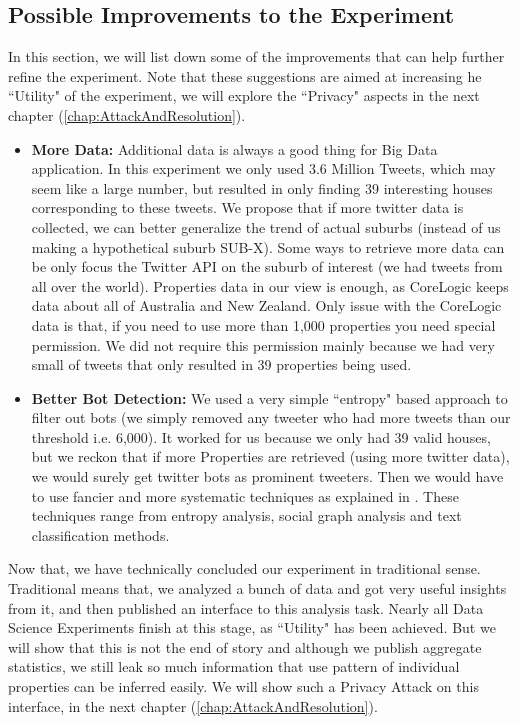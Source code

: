 \documentclass[12pt]{report}
\theoremstyle{named}
\begin{document}
\subsection{Possible Improvements to the Experiment}
In this section, we will list down some of the improvements that can help further refine the experiment. Note that these suggestions are aimed at increasing he ``Utility" of the experiment, we will explore the ``Privacy" aspects in the next chapter (\ref{chap:AttackAndResolution}).
\begin{itemize}
  \item \textbf{More Data:} Additional data is always a good thing for Big Data application. In this experiment we only used 3.6 Million Tweets, which may seem like a large number, but resulted in only finding 39 interesting houses corresponding to these tweets. We propose that if more twitter data is collected, we can better generalize the trend of actual suburbs (instead of us making a hypothetical suburb SUB-X). Some ways to retrieve more data can be only focus the Twitter API on the suburb of interest (we had tweets from all over the world). Properties data in our view is enough, as CoreLogic keeps data about all of Australia and New Zealand. Only issue with the CoreLogic data is that, if you need to use more than 1,000 properties you need special permission. We did not require this permission mainly because we had very small of tweets that only resulted in 39 properties being used.
  
  \item \textbf{Better Bot Detection:} We used a very simple ``entropy" based approach to filter out bots (we simply removed any tweeter who had more tweets than our threshold i.e. 6,000). It worked for us because we only had 39 valid houses, but we reckon that if more Properties are retrieved (using more twitter data), we would surely get twitter bots as prominent tweeters. Then we would have to use fancier and more systematic techniques as explained in \cite{chu2010tweeting}. These techniques range from entropy analysis, social graph analysis and text classification methods.

\end{itemize}


Now that, we have technically concluded our experiment in traditional sense. Traditional means that, we analyzed a bunch of data and got very useful insights from it, and then published an interface to this analysis task. Nearly all Data Science Experiments finish at this stage, as ``Utility" has been achieved. But we will show that this is not the end of story and although we publish aggregate statistics, we still leak so much information that use pattern of individual properties can be inferred easily. We will show such a Privacy Attack on this interface, in the next chapter (\ref{chap:AttackAndResolution}).
\end{document}

